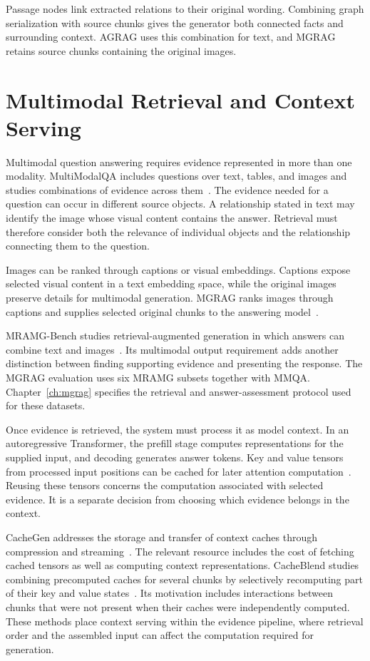 Passage nodes link extracted relations to their original wording. Combining graph serialization with source chunks gives the generator both connected facts and surrounding context. AGRAG uses this combination for text, and MGRAG retains source chunks containing the original images.

\section{Multimodal Retrieval and Context Serving}
\label{sec:background:multimodal}

Multimodal question answering requires evidence represented in more than one modality. MultiModalQA includes questions over text, tables, and images and studies combinations of evidence across them~\cite{bg-mmqa}. The evidence needed for a question can occur in different source objects. A relationship stated in text may identify the image whose visual content contains the answer. Retrieval must therefore consider both the relevance of individual objects and the relationship connecting them to the question.

Images can be ranked through captions or visual embeddings. Captions expose selected visual content in a text embedding space, while the original images preserve details for multimodal generation. MGRAG ranks images through captions and supplies selected original chunks to the answering model~\cite{bg-mgrag}.

MRAMG-Bench studies retrieval-augmented generation in which answers can combine text and images~\cite{bg-mramg}. Its multimodal output requirement adds another distinction between finding supporting evidence and presenting the response. The MGRAG evaluation uses six MRAMG subsets together with MMQA. Chapter~\ref{ch:mgrag} specifies the retrieval and answer-assessment protocol used for these datasets.

Once evidence is retrieved, the system must process it as model context. In an autoregressive Transformer, the prefill stage computes representations for the supplied input, and decoding generates answer tokens. Key and value tensors from processed input positions can be cached for later attention computation~\cite{bg-transformer,bg-cacheblend}. Reusing these tensors concerns the computation associated with selected evidence. It is a separate decision from choosing which evidence belongs in the context.

CacheGen addresses the storage and transfer of context caches through compression and streaming~\cite{bg-cachegen}. The relevant resource includes the cost of fetching cached tensors as well as computing context representations. CacheBlend studies combining precomputed caches for several chunks by selectively recomputing part of their key and value states~\cite{bg-cacheblend}. Its motivation includes interactions between chunks that were not present when their caches were independently computed. These methods place context serving within the evidence pipeline, where retrieval order and the assembled input can affect the computation required for generation.

